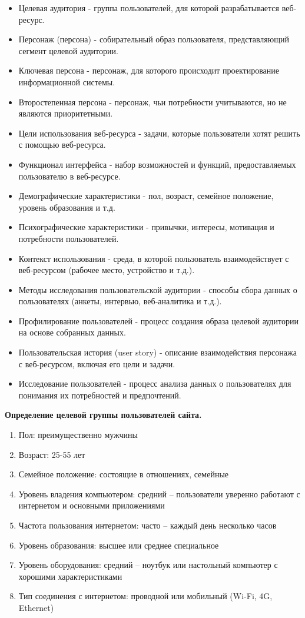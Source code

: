 \begin{itemize}
    \item Целевая аудитория - группа пользователей, для которой разрабатывается веб-ресурс.
    \item Персонаж (персона) - собирательный образ пользователя, представляющий сегмент целевой аудитории.
    \item Ключевая персона - персонаж, для которого происходит проектирование информационной системы.
    \item Второстепенная персона - персонаж, чьи потребности учитываются, но не являются приоритетными.
    \item Цели использования веб-ресурса - задачи, которые пользователи хотят решить с помощью веб-ресурса.
    \item Функционал интерфейса - набор возможностей и функций, предоставляемых пользователю в веб-ресурсе.
    \item Демографические характеристики - пол, возраст, семейное положение, уровень образования и т.д.
    \item Психографические характеристики - привычки, интересы, мотивация и потребности пользователей.
    \item Контекст использования - среда, в которой пользователь взаимодействует с веб-ресурсом (рабочее место, устройство и т.д.).
    \item Методы исследования пользовательской аудитории - способы сбора данных о пользователях (анкеты, интервью, веб-аналитика и т.д.).
    \item Профилирование пользователей - процесс создания образа целевой аудитории на основе собранных данных.
    \item Пользовательская история (user story) - описание взаимодействия персонажа с веб-ресурсом, включая его цели и задачи.
    \item Исследование пользователей - процесс анализа данных о пользователях для понимания их потребностей и предпочтений.
\end{itemize}
\bigskip

\textbf{Определение целевой группы пользователей сайта.}

\begin{enumerate}
    \item Пол: преимущественно мужчины
    \item Возраст: 25-55 лет
    \item Семейное положение: состоящие в отношениях, семейные
    \item Уровень владения компьютером: средний – пользователи уверенно работают с интернетом и основными приложениями
    \item Частота пользования интернетом: часто – каждый день несколько часов
    \item Уровень образования: высшее или среднее специальное
    \item Уровень оборудования: средний – ноутбук или настольный компьютер с хорошими характеристиками
    \item Тип соединения с интернетом: проводной или мобильный (Wi-Fi, 4G, Ethernet)
\end{enumerate}
\bigskip

